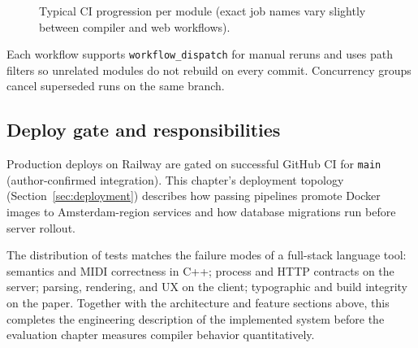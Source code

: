 \begin{figure}[htbp]
  \centering
  \caption{Typical CI progression per module (exact job names vary slightly between compiler and web workflows).}%
  \label{fig:ci-flow}
\end{figure}

Each workflow supports \texttt{workflow\_dispatch} for manual reruns and uses path filters so unrelated modules do not
rebuild on every commit.
Concurrency groups cancel superseded runs on the same branch.

\subsection{Deploy gate and responsibilities}\label{subsec:deploy-gate}

Production deploys on Railway are gated on successful GitHub CI for \texttt{main} (author-confirmed integration).
This chapter's deployment topology (Section~\ref{sec:deployment}) describes how passing pipelines promote Docker images
to Amsterdam-region services and how database migrations run before server rollout.

The distribution of tests matches the failure modes of a full-stack language tool: semantics and MIDI correctness in
C++; process and HTTP contracts on the server; parsing, rendering, and UX on the client; typographic and build integrity
on the paper.
Together with the architecture and feature sections above, this completes the engineering description of the
implemented system before the evaluation chapter measures compiler behavior quantitatively.
